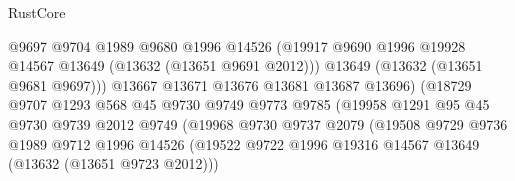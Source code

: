 \begin{lexlean}{RustCore}
\begin{coremodule}
                                      @9697
                                      @9704
                                      @1989
                                      @9680
                                      @1996
                                      @14526
                                      (@19917
                                        @9690
                                        @1996
                                        @19928
                                        @14567
                                        @13649
                                        (@13632 (@13651 @9691 @2012)))
                                      @13649
                                      (@13632 (@13651 @9681 @9697)))
                                    @13667
                                    @13671
                                    @13676
                                    @13681
                                    @13687
                                    @13696)
                                  (@18729
                                    @9707
                                    @1293
                                    @568
                                    @45
                                    @9730
                                    @9749
                                    @9773
                                    @9785
                                    (@19958
                                      @1291
                                      @95
                                      @45
                                      @9730
                                      @9739
                                      @2012
                                      @9749
                                      (@19968
                                        @9730
                                        @9737
                                        @2079
                                        (@19508
                                          @9729
                                          @9736
                                          @1989
                                          @9712
                                          @1996
                                          @14526
                                          (@19522
                                            @9722
                                            @1996
                                            @19316
                                            @14567
                                            @13649
                                            (@13632 (@13651 @9723 @2012)))

\end{coremodule}
\end{lexlean}
